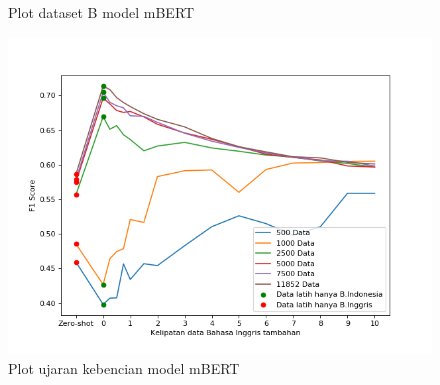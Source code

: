 \begin{figure}[htb]
            \caption{Plot dataset B model mBERT}
            \label{fig:plot_head_prosa_mbert}
            \endminipage\hfill
            \centering
            \minipage{0.33\paperwidth}
            \includegraphics[width=\linewidth]{resources/plot-head-toxic-mbert.png}
            \caption{Plot ujaran kebencian model mBERT}
            \label{fig:plot_head_toxic_mbert}
            \endminipage
        \end{figure}

